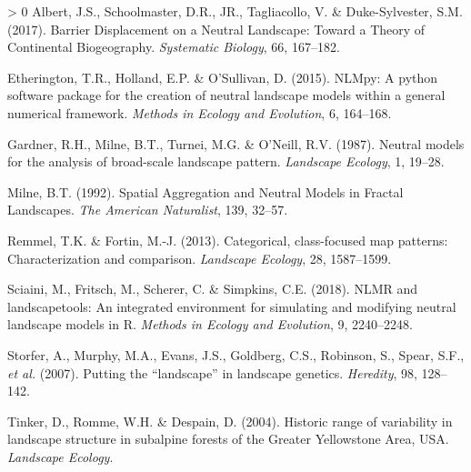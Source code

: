 \documentclass[11pt]{article}
\newlength{\cslhangindent}
\newenvironment{CSLReferences}[3] %
 {%
  \setlength{\parindent}{0pt}
  \ifodd #1 \everypar{\setlength{\hangindent}{\cslhangindent}}\ignorespaces\fi
  \ifnum #2 > 0
  \setlength{\parskip}{#2\baselineskip}
  \fi
 }%
 {}
\begin{document}
\hypertarget{refs}{}
\begin{CSLReferences}{1}{0}
\leavevmode\hypertarget{ref-Albert2017BarDis}{}%
Albert, J.S., Schoolmaster, D.R., JR., Tagliacollo, V. \&
Duke-Sylvester, S.M. (2017). Barrier Displacement on a Neutral
Landscape: Toward a Theory of Continental Biogeography. \emph{Systematic
Biology}, 66, 167--182.

\leavevmode\hypertarget{ref-Etherington2015NlmPyt}{}%
Etherington, T.R., Holland, E.P. \& O'Sullivan, D. (2015). NLMpy: A
python software package for the creation of neutral landscape models
within a general numerical framework. \emph{Methods in Ecology and
Evolution}, 6, 164--168.

\leavevmode\hypertarget{ref-Gardner1987NeuMod}{}%
Gardner, R.H., Milne, B.T., Turnei, M.G. \& O'Neill, R.V. (1987).
Neutral models for the analysis of broad-scale landscape pattern.
\emph{Landscape Ecology}, 1, 19--28.

\leavevmode\hypertarget{ref-Milne1992SpaAgg}{}%
Milne, B.T. (1992). Spatial Aggregation and Neutral Models in Fractal
Landscapes. \emph{The American Naturalist}, 139, 32--57.

\leavevmode\hypertarget{ref-Remmel2013CatCla}{}%
Remmel, T.K. \& Fortin, M.-J. (2013). Categorical, class-focused map
patterns: Characterization and comparison. \emph{Landscape Ecology}, 28,
1587--1599.

\leavevmode\hypertarget{ref-Sciaini2018NlmLan}{}%
Sciaini, M., Fritsch, M., Scherer, C. \& Simpkins, C.E. (2018). NLMR and
landscapetools: An integrated environment for simulating and modifying
neutral landscape models in R. \emph{Methods in Ecology and Evolution},
9, 2240--2248.

\leavevmode\hypertarget{ref-Storfer2007PutLan}{}%
Storfer, A., Murphy, M.A., Evans, J.S., Goldberg, C.S., Robinson, S.,
Spear, S.F., \emph{et al.} (2007). Putting the {``landscape''} in
landscape genetics. \emph{Heredity}, 98, 128--142.

\leavevmode\hypertarget{ref-Tinker2004HisRan}{}%
Tinker, D., Romme, W.H. \& Despain, D. (2004). Historic range of
variability in landscape structure in subalpine forests of the Greater
Yellowstone Area, USA. \emph{Landscape Ecology}.

\end{CSLReferences}
\end{document}
